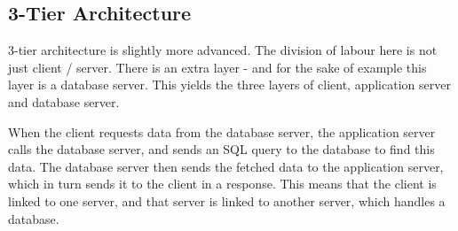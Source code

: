 \subsection{3-Tier Architecture}

3-tier architecture is slightly more advanced. The division of labour here is not just 
client / server. There is an extra layer - and for the sake of example this layer is a 
database server. This yields the three layers of client, application server and database 
server. 


When the client requests data from the database server, the application server calls the database server, and 
sends an SQL query to the database to find this data. The database server then sends the 
fetched data to the application server, which in turn sends it to the client in a response. This 
means that the client is linked to one server, and that server is linked to another server, 
which handles a database\cite{tierserverclient08}.